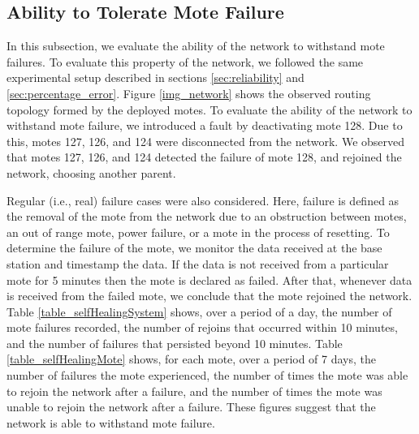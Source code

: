\subsection{Ability to Tolerate Mote Failure}\label{sec:tolerate_mote_failure}
In this subsection, we evaluate the ability of the network to withstand mote failures. To evaluate this property of the network, we followed the same experimental setup described in sections \ref{sec:reliability} and \ref{sec:percentage_error}. Figure \ref{img_network} shows the observed routing topology formed by the deployed motes. To evaluate the ability of the network to withstand mote failure, we introduced a fault by deactivating mote 128. Due to this, motes 127, 126, and 124 were disconnected from the network. We observed that motes 127, 126, and 124 detected the failure of mote 128, and rejoined the network, choosing another parent.

Regular (i.e., real) failure cases were also considered. Here, failure is defined as the removal of the mote from the network due to an obstruction between motes, an out of range mote, power failure, or a mote in the process of resetting. To determine the failure of the mote, we monitor the data received at the base station and timestamp the data. If the data is not received from a particular mote for 5 minutes then the mote is declared as failed. After that, whenever data is received from the failed mote, we conclude that the mote rejoined the network. Table \ref{table_selfHealingSystem} shows, over a period of a day, the number of mote failures recorded,  the number of rejoins that occurred within 10 minutes, and the number of failures that persisted beyond 10 minutes. Table \ref{table_selfHealingMote} shows, for each mote, over a period of 7 days, the number of failures the mote experienced, the number of times the mote was able to rejoin the network after a failure, and the number of times the mote was unable to rejoin the network after a failure. These figures suggest that the network is able to withstand mote failure.

